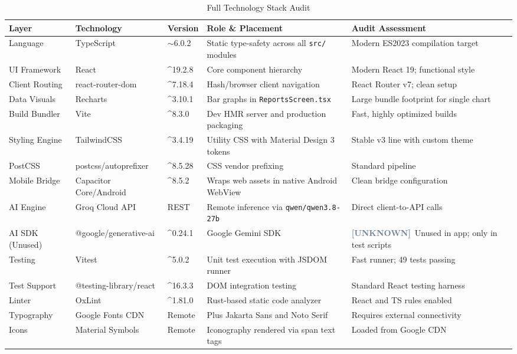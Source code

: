 \documentclass[10pt,a4paper]{report}
\newcommand{\unknown}{\colorbox{gray!20}{\textcolor{slateGray}{\bfseries\scriptsize [UNKNOWN]}}}
\begin{document}
\begin{table}[htbp]
\centering
\scriptsize
\caption{Full Technology Stack Audit}
\begin{tabularx}{\textwidth}{l l l X p{3.2cm}}
\toprule
\textbf{Layer} & \textbf{Technology} & \textbf{Version} & \textbf{Role \& Placement} & \textbf{Audit Assessment} \\
\midrule
Language & TypeScript & $\sim$6.0.2 & Static type-safety across all \texttt{src/} modules & Modern ES2023 compilation target \\
UI Framework & React & \textasciicircum 19.2.8 & Core component hierarchy & Modern React 19; functional style \\
Client Routing & react-router-dom & \textasciicircum 7.18.4 & Hash/browser client navigation & React Router v7; clean setup \\
Data Visuals & Recharts & \textasciicircum 3.10.1 & Bar graphs in \texttt{ReportsScreen.tsx} & Large bundle footprint for single chart \\
Build Bundler & Vite & \textasciicircum 8.3.0 & Dev HMR server and production packaging & Fast, highly optimized builds \\
Styling Engine & TailwindCSS & \textasciicircum 3.4.19 & Utility CSS with Material Design 3 tokens & Stable v3 line with custom theme \\
PostCSS & postcss/autoprefixer & \textasciicircum 8.5.28 & CSS vendor prefixing & Standard pipeline \\
Mobile Bridge & Capacitor Core/Android & \textasciicircum 8.5.2 & Wraps web assets in native Android WebView & Clean bridge configuration \\
AI Engine & Groq Cloud API & REST & Remote inference via \texttt{qwen/qwen3.8-27b} & Direct client-to-API calls \\
AI SDK (Unused) & @google/generative-ai & \textasciicircum 0.24.1 & Google Gemini SDK & \unknown\ Unused in app; only in test scripts \\
Testing & Vitest & \textasciicircum 5.0.2 & Unit test execution with JSDOM runner & Fast runner; 49 tests passing \\
Test Support & @testing-library/react & \textasciicircum 16.3.3 & DOM integration testing & Standard React testing harness \\
Linter & OxLint & \textasciicircum 1.81.0 & Rust-based static code analyzer & React and TS rules enabled \\
Typography & Google Fonts CDN & Remote & Plus Jakarta Sans and Noto Serif & Requires external connectivity \\
Icons & Material Symbols & Remote & Iconography rendered via span text tags & Loaded from Google CDN \\
\bottomrule
\end{tabularx}
\end{table}
\end{document}
